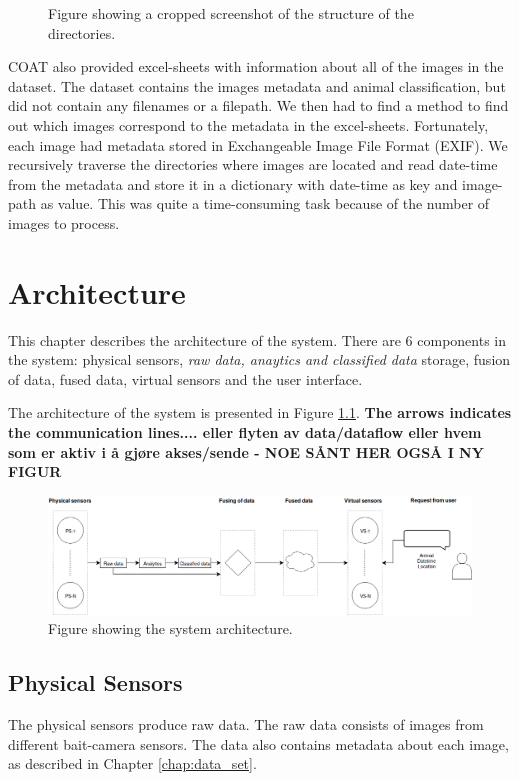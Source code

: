 \documentclass[USenglish]{uit-thesis}
\begin{document}
\begin{figure}
\caption{Figure showing a cropped screenshot of the structure of the directories.}
\label{fig:directories}
\end{figure}


COAT also provided excel-sheets with information about all of the images in the dataset. The dataset contains the images metadata and animal classification, but did not contain any filenames or a filepath. We then had to find a method to find out which images correspond to the metadata in the excel-sheets. Fortunately, each image had metadata stored in Exchangeable Image File Format (EXIF). We recursively traverse the directories where images are located and read date-time from the metadata and store it in a dictionary with date-time as key and image-path as value. This was quite a time-consuming task because of the number of images to process.


\chapter{Architecture}
This chapter describes the architecture of the system.
There are 6 components in the system: physical sensors, \textit{raw data, anaytics and classified data} storage, fusion of data, fused data, virtual sensors and the user interface. 

The architecture of the system is presented in Figure \ref{fig:architecture}. \textbf{The arrows indicates the communication lines.... eller flyten av data/dataflow eller hvem som er aktiv i å gjøre akses/sende - NOE SÅNT HER OGSÅ I NY FIGUR}

\begin{figure}
\centering
\includegraphics[width=\textwidth]{Architecture_otto.png}
\caption{Figure showing the system architecture.}
\label{fig:architecture}
\end{figure}


\section{Physical Sensors}
The physical sensors produce raw data. The raw data consists of images from different bait-camera sensors.
The data also contains metadata about each image, as described in Chapter \ref{chap:data_set}. 
\end{document}
